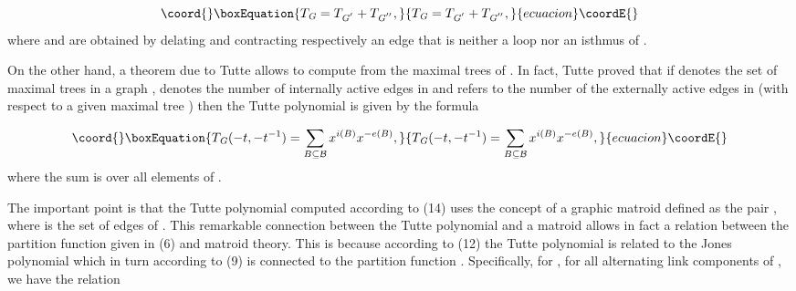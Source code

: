 \documentclass[a4paper,12pt]{article}
\begin{document}
\begin{equation}\coord{}\boxEquation{
T_{\mathit{G}}=T_{\mathit{G}^{^{\prime }}}+T_{\mathit{G}^{^{\prime \prime
}}},  \label{13}
}{
T_{\mathit{G}}=T_{\mathit{G}^{^{\prime }}}+T_{\mathit{G}^{^{\prime \prime
}}},  }{ecuacion}\coordE{}\end{equation}
where \coordHE{} and \coordHE{} are obtained
by delating and contracting respectively an edge that is neither a loop nor
an isthmus of \coordHE{}.

On the other hand, a theorem due to Tutte allows to compute \coordHE{} from the maximal trees of \coordHE{}. In fact, Tutte proved
that if \coordHE{} denotes the set of maximal trees in a graph \coordHE{}, \coordHE{} denotes the number of internally active edges in \coordHE{} and \coordHE{} refers to the number of the externally active edges
in \coordHE{} (with respect to a given maximal tree \coordHE{})
then the Tutte polynomial is given by the formula

\begin{equation}\coord{}\boxEquation{
T_{\mathit{G}}(-t,-t^{-1})=\sum_{B\subseteq \mathcal{B}}x^{i(B)}x^{-e(B)},
\label{14}
}{
T_{\mathit{G}}(-t,-t^{-1})=\sum_{B\subseteq \mathcal{B}}x^{i(B)}x^{-e(B)},
}{ecuacion}\coordE{}\end{equation}
where the sum is over all elements of \coordHE{}.

The important point is that the Tutte polynomial \coordHE{}
computed according to (14) uses the concept of a graphic matroid \coordHE{} defined as the pair \coordHE{}, where \coordHE{} is the set of edges of 
\coordHE{}. This remarkable connection between the Tutte polynomial and a
matroid allows in fact a relation between the partition function \coordHE{}
given in (6) and matroid theory. This is because according to (12) the Tutte
polynomial \coordHE{} is related to the Jones polynomial \coordHE{} which in turn according to (9) is connected to the partition
function \coordHE{}. Specifically, for \coordHE{}  \coordHE{}, \coordHE{} for all alternating link components of \coordHE{}, we have the relation
\end{document}
